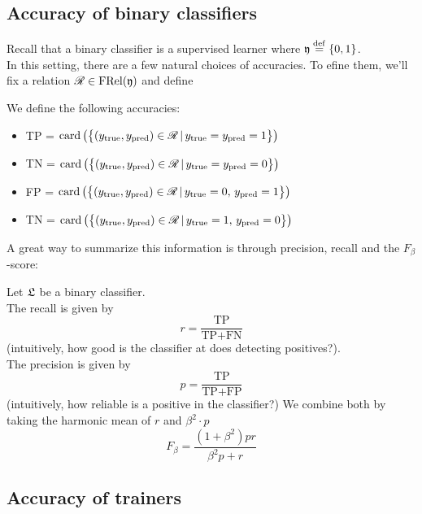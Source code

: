 \subsection{Accuracy of binary classifiers}
Recall that a binary classifier is a supervised learner where $\mathfrak{y}\stackrel{\operatorname{def}}{=} \{0,1\}$.\\
In this setting, there are a few natural choices of accuracies. To efine them, we'll fix a relation $\r{R}\in \FRel(\f{y})$ and define
\begin{definition}\label{sl:def:binacc}
We define the following accuracies:
\begin{itemize}
\item TP = $\card\big(\big\{(y_{\true},y_{\pred}) \in \r{R}\, \vert\, y_{\true}=y_{\pred} = 1 \big\}\big)$
 \item TN = $\card\big(\big\{(y_{\true},y_{\pred}) \in \r{R} \, \vert\, y_{\true}=y_{\pred} = 0 \big\}\big)$
 \item FP = $\card\big(\big\{(y_{\true},y_{\pred}) \in \r{R}\, \vert\, y_{\true}=0,\, y_{\pred} = 1 \big\}\big)$
 \item TN = $\card\big(\big\{(y_{\true},y_{\pred}) \in \r{R}\, \vert\, y_{\true}=1,\, y_{\pred} = 0 \big\}\big)$
\end{itemize}
\end{definition}
A great way to summarize this information is through precision, recall and the $F_\beta$-score:
\begin{definition}
Let $\mathfrak{L}$ be a binary classifier.\\
The recall is given by
\[
r=\frac{\text{TP}}{\text{TP}+\text{FN}}
\]
(intuitively, how good is the classifier at does detecting positives?).\\
The precision is given by
\[
p= \frac{\text{TP}}{\text{TP}+\text{FP}}
\]
(intuitively, how reliable is a positive in the classifier?)
We combine both by taking the harmonic mean of $r$ and $\beta^2\cdot p$
\[
F_\beta = \frac{(1+\beta^2)pr}{\beta^2p+r}
\]
\end{definition}

\subsection{Accuracy of trainers}


